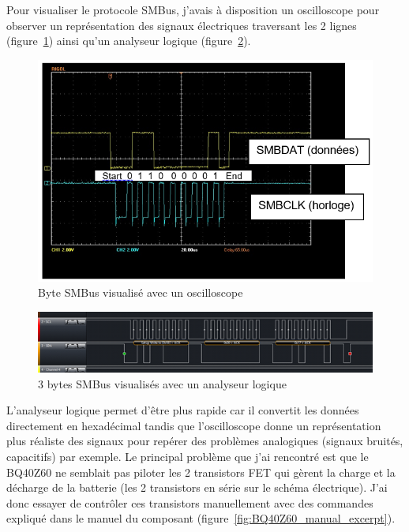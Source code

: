 \documentclass[a4paper, 11pt]{report}
\begin{document}
Pour visualiser le protocole SMBus, j’avais à disposition un oscilloscope pour observer un représentation des signaux électriques traversant les 2 lignes (figure~\ref{fig:SMBus_oscilloscope}) ainsi qu’un analyseur logique (figure~\ref{fig:SMBus_logic_analyser}).

\begin{figure}[!h]
\begin{center}
\includegraphics[scale=0.6]{figures/screenshots/SMBus_oscilloscope.png}
\end{center}
\caption{Byte SMBus visualisé avec un oscilloscope}
\label{fig:SMBus_oscilloscope}
\end{figure}

\begin{figure}[!h]
\begin{center}
\includegraphics[scale=0.9]{figures/screenshots/SMBus_logic_analyser.png}
\end{center}
\caption{3 bytes SMBus visualisés avec un analyseur logique}
\label{fig:SMBus_logic_analyser}
\end{figure}

L’analyseur logique permet d’être plus rapide car il convertit les données directement en hexadécimal tandis que l’oscilloscope donne un représentation plus réaliste des signaux pour repérer des problèmes analogiques (signaux bruités, capacitifs) par exemple.
Le principal problème que j’ai rencontré est que le BQ40Z60 ne semblait pas piloter les 2 transistors FET qui gèrent la charge et la décharge de la batterie (les 2 transistors en série sur le schéma électrique).
J’ai donc essayer de contrôler ces transistors manuellement avec des commandes expliqué dans le manuel du composant (figure~\ref{fig:BQ40Z60_manual_excerpt}).
\end{document}
